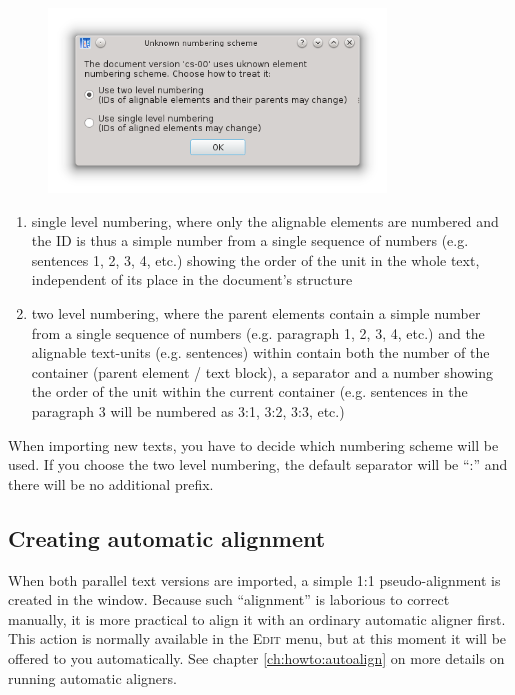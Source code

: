 \documentclass[a4paper,10pt,oneside]{book}
\newcommand{\menu}[1]{\textsc{#1}}
\begin{document}
\begin{figure}[htb]
 \includegraphics[width=0.8\textwidth]{screenshots/numbering_dialog.png}
\end{figure}

\begin{enumerate}
 \item single level numbering, where only the alignable elements are numbered and the ID is thus a simple number from a single sequence of numbers (e.g. sentences 1, 2, 3, 4, etc.) showing the order of the unit in the whole text, independent of its place in the document's structure
 \item two level numbering, where the parent elements contain a simple number from a single sequence of numbers (e.g. paragraph 1, 2, 3, 4, etc.) and the alignable text-units (e.g. sentences) within contain both the number of the container (parent element / text block), a separator and a number showing the order of the unit within the current container (e.g. sentences in the paragraph 3 will be numbered as 3:1, 3:2, 3:3, etc.)
\end{enumerate}

When importing new texts, you have to decide which numbering scheme will be used. If you choose the two level numbering, the default separator will be ``:'' and there will be no additional prefix.

\subsection{Creating automatic alignment}\label{ch:detail:managing_local:new:align}

When both parallel text versions are imported, a simple 1:1 pseudo-alignment is created in the window. Because such ``alignment'' is laborious to correct manually, it is more practical to align it with an ordinary automatic aligner first. This action is normally available in the \menu{Edit} menu, but at this moment it will be offered to you automatically. See chapter \ref{ch:howto:autoalign} on more details on running automatic aligners.
\end{document}
